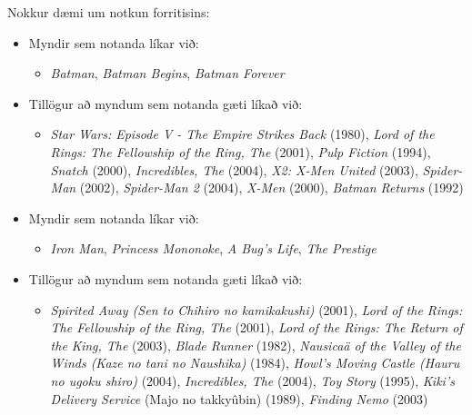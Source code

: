 \documentclass[12pt, git, draft]{rureport}
\begin{document}
Nokkur dæmi um notkun forritisins:
\begin{itemize}
	\item Myndir sem notanda líkar við:
	\begin{itemize}
		\item \textit{Batman}, \textit{Batman Begins}, \textit{Batman Forever}
	\end{itemize}
	\item Tillögur að myndum sem notanda gæti líkað við:
	\begin{itemize}
		\item \textit{Star Wars: Episode V - The Empire Strikes Back}  (1980), \textit{Lord of the Rings: The Fellowship of the Ring, The}  (2001), \textit{Pulp Fiction}  (1994), \textit{Snatch}  (2000), \textit{Incredibles, The}  (2004), \textit{X2: X-Men United}  (2003), \textit{Spider-Man}  (2002), \textit{Spider-Man 2}  (2004), \textit{X-Men}  (2000), \textit{Batman Returns}  (1992)
	\end{itemize}
	
	\item Myndir sem notanda líkar við:
	\begin{itemize}
		\item \textit{Iron Man}, \textit{Princess Mononoke}, \textit{A Bug's Life}, \textit{The Prestige}
	\end{itemize}
	\item Tillögur að myndum sem notanda gæti líkað við:
	\begin{itemize}
		\item \textit{Spirited Away (Sen to Chihiro no kamikakushi)}  (2001), \textit{Lord of the Rings: The Fellowship of the Ring, The}  (2001), \textit{Lord of the Rings: The Return of the King, The}  (2003), \textit{Blade Runner}  (1982), \textit{Nausicaä of the Valley of the Winds (Kaze no tani no Naushika)}  (1984), \textit{Howl's Moving Castle (Hauru no ugoku shiro)}  (2004), \textit{Incredibles, The}  (2004), \textit{Toy Story}  (1995), \textit{Kiki's Delivery Service} (Majo no takkyûbin)  (1989), \textit{Finding Nemo}  (2003)
	\end{itemize}
	

\end{itemize}
\end{document}
